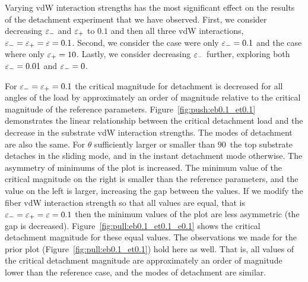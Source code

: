 Varying vdW interaction strengths has the most significant effect on the results of the detachment experiment that we have observed. First, we consider decreasing $\varepsilon_-$ and $\varepsilon_+$ to $0.1$ and then all three vdW interactions, $\varepsilon_- = \varepsilon_+ = \varepsilon = 0.1$. Second, we consider the case were only $\varepsilon_-=0.1$ and the case where only $\varepsilon_+=10$. Lastly, we consider decreasing $\varepsilon_-$ further, exploring both $\varepsilon_-=0.01$ and $\varepsilon_-=0$.

For $\varepsilon_- = \varepsilon_+ = 0.1$ the critical magnitude for detachment is decreased for all angles of the load by approximately an order of magnitude relative to the critical magnitude of the reference parameters. Figure~\ref{fig:push:eb0.1_et0.1} demonstrates the linear relationship between the critical detachment load and the decrease in the substrate vdW interaction strengths. The modes of detachment are also the same. For $\theta$ sufficiently larger or smaller than $90$\textdegree\ the top substrate detaches in the sliding mode, and in the instant detachment mode otherwise. The asymmetry of minimums of the plot is increased. The minimum value of the critical magnitude on the right is smaller than the reference parameters, and the  value on the left is larger, increasing the gap between the values. If we modify the fiber vdW interaction strength so that all values are equal, that is $\varepsilon_- = \varepsilon_+ = \varepsilon = 0.1$ then the minimum values of the plot are less asymmetric (the gap is decreased). Figure~\ref{fig:pull:eb0.1_et0.1_e0.1} shows the critical detachment magnitude for these equal values. The observations we made for the prior plot (Figure~\ref{fig:pull:eb0.1_et0.1}) hold here as well. That is, all values of the critical detachment magnitude are approximately an order of magnitude lower than the reference case, and the modes of detachment are similar.

